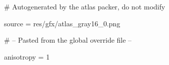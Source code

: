 # Autogenerated by the atlas packer, do not modify

source = res/gfx/atlas_gray16_0.png

# -- Pasted from the global override file --

anisotropy = 1
